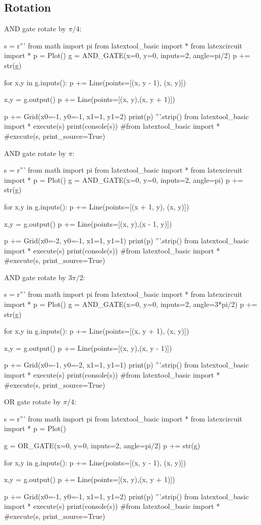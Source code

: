 \newpage
\subsection{Rotation}
AND gate rotate by $\pi/4$:
\begin{python}
s = r'''
from math import pi
from latextool_basic import *
from latexcircuit import *
p = Plot()
g = AND_GATE(x=0, y=0, inputs=2, angle=pi/2)
p += str(g)

for x,y in g.inputs():
    p += Line(points=[(x, y - 1), (x, y)])

x,y = g.output()
p += Line(points=[(x, y),(x, y + 1)])

p += Grid(x0=-1, y0=-1, x1=1, y1=2)
print(p)
'''.strip()
from latextool_basic import *
execute(s)
print(console(s))
#from latextool_basic import *
#execute(s, print_source=True)
\end{python}

\newpage
AND gate rotate by $\pi$:
\begin{python}
s = r'''
from math import pi
from latextool_basic import *
from latexcircuit import *
p = Plot()
g = AND_GATE(x=0, y=0, inputs=2, angle=pi)
p += str(g)

for x,y in g.inputs():
    p += Line(points=[(x + 1, y), (x, y)])

x,y = g.output()
p += Line(points=[(x, y),(x - 1, y)])

p += Grid(x0=-2, y0=-1, x1=1, y1=1)
print(p)
'''.strip()
from latextool_basic import *
execute(s)
print(console(s))
#from latextool_basic import *
#execute(s, print_source=True)
\end{python}

\newpage
AND gate rotate by $3\pi/2$:
\begin{python}
s = r'''
from math import pi
from latextool_basic import *
from latexcircuit import *
p = Plot()
g = AND_GATE(x=0, y=0, inputs=2, angle=3*pi/2)
p += str(g)

for x,y in g.inputs():
    p += Line(points=[(x, y + 1), (x, y)])

x,y = g.output()
p += Line(points=[(x, y),(x, y - 1)])

p += Grid(x0=-1, y0=-2, x1=1, y1=1)
print(p)
'''.strip()
from latextool_basic import *
execute(s)
print(console(s))
#from latextool_basic import *
#execute(s, print_source=True)
\end{python}


\newpage
OR gate rotate by $\pi/4$:
\begin{python}
s = r'''
from math import pi
from latextool_basic import *
from latexcircuit import *
p = Plot()

g = OR_GATE(x=0, y=0, inputs=2, angle=pi/2)
p += str(g)

for x,y in g.inputs():
    p += Line(points=[(x, y - 1), (x, y)])

x,y = g.output()
p += Line(points=[(x, y),(x, y + 1)])

p += Grid(x0=-1, y0=-1, x1=1, y1=2)
print(p)
'''.strip()
from latextool_basic import *
execute(s)
print(console(s))
#from latextool_basic import *
#execute(s, print_source=True)
\end{python}

